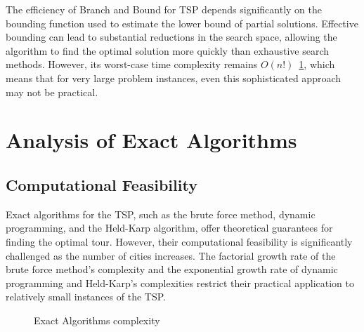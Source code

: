 The efficiency of Branch and Bound for TSP depends significantly on the bounding function used to estimate the lower bound of partial solutions. Effective bounding can lead to substantial reductions in the search space, allowing the algorithm to find the optimal solution more quickly than exhaustive search methods. However, its worst-case time complexity remains $O(n!)$~\ref{fig:agl_complexity}, which means that for very large problem instances, even this sophisticated approach may not be practical.


\section{Analysis of Exact Algorithms}

\subsection{Computational Feasibility}

Exact algorithms for the TSP, such as the brute force method, dynamic programming, and the Held-Karp algorithm, offer theoretical guarantees for finding the optimal tour. However, their computational feasibility is significantly challenged as the number of cities increases. The factorial growth rate of the brute force method's complexity and the exponential growth rate of dynamic programming and Held-Karp's complexities restrict their practical application to relatively small instances of the TSP.

\begin{center}
	\begin{figure}[h]
		\caption{Exact Algorithms complexity}
		\label{fig:agl_complexity}
	\end{figure}
\end{center}

